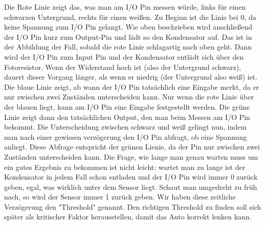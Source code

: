 	
	Die Rote Linie zeigt das, was man am I/O Pin messen würde, links für einen schwarzen Untergrund, rechts für einen weißen. Zu Beginn ist die Linie bei 0, da keine Spannung zum I/O Pin gelangt. Wie oben beschrieben wird anschließend der I/O Pin kurz zum Output-Pin und lädt so den Kondensator auf. Das ist in der Abbildung der Fall, sobald die rote Linie schlagartig nach oben geht. Dann wird der I/O Pin zum Input Pin und der Kondensator entlädt sich über den Fotoresistor. Wenn der Widerstand hoch ist (also der Untergrund schwarz), dauert dieser Vorgang länger, als wenn er niedrig (der Untergrund also weiß) ist. Die blaue Linie zeigt, ab wann der I/O Pin tatsächlich eine Eingabe merkt, da er nur zwischen zwei Zuständen unterscheiden kann. Nur wenn die rote Linie über der blauen liegt, kann am I/O Pin eine Eingabe festgestellt werden. Die grüne Linie zeigt dann den tatsächlichen Output, den man beim Messen am I/O Pin bekommt. Die Unterscheidung zwischen schwarz und weiß gelingt nun, indem man nach einer gewissen verzögerung den I/O Pin abfragt, ob eine Spannung anliegt. Diese Abfrage entspricht der grünen Lienie, da der Pin nur zwischen zwei Zuständen unterscheiden kann. Die Frage, wie lange man genau warten muss um ein gutes Ergebnis zu bekommen ist nicht leicht: wartet man zu lange ist der Kondensator in jedem Fall schon entladen und der I/O Pin wird immer 0 zurück geben, egal, was wirklich unter dem Sensor liegt. Schaut man umgedreht zu früh nach, so wird der Sensor immer 1 zurück geben. Wir haben diese zeitliche Verzögerung den "Threshold" genannt. Den richtigen Threshold zu finden soll sich später als kritischer Faktor herausstellen, damit das Auto korrekt lenken kann. 
	  
